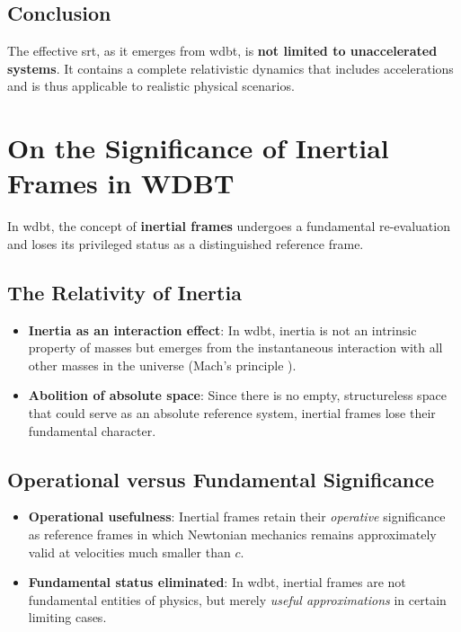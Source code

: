 \subsection{Conclusion}
The effective \gls{srt}, as it emerges from \gls{wdbt}, is \textbf{not limited to unaccelerated systems}. It contains a complete relativistic dynamics that includes accelerations and is thus applicable to realistic physical scenarios.

\section{On the Significance of Inertial Frames in WDBT}

In \gls{wdbt}, the concept of \textbf{inertial frames} undergoes a fundamental re-evaluation and loses its privileged status as a distinguished reference frame.

\subsection{The Relativity of Inertia}

\begin{itemize}
    \item \textbf{Inertia as an interaction effect}: In \gls{wdbt}, inertia is not an intrinsic property of masses but emerges from the instantaneous interaction with all other masses in the universe (Mach's principle \cite{Assis1999}).
    \item \textbf{Abolition of absolute space}: Since there is no empty, structureless space that could serve as an absolute reference system, inertial frames lose their fundamental character.
\end{itemize}

\subsection{Operational versus Fundamental Significance}

\begin{itemize}
    \item \textbf{Operational usefulness}: Inertial frames retain their \emph{operative} significance as reference frames in which Newtonian mechanics remains approximately valid at velocities much smaller than $c$.
    \item \textbf{Fundamental status eliminated}: In \gls{wdbt}, inertial frames are not fundamental entities of physics, but merely \emph{useful approximations} in certain limiting cases.
\end{itemize}

